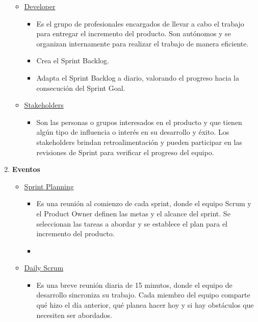 \documentclass[12pt, letterpaper]{article}
\begin{document}
\begin{enumerate}
\begin{itemize}
            \item \underline{Developer}
                \begin{itemize}
                    \item Es el grupo de profesionales encargados de llevar a cabo el trabajo para entregar el 
                    incremento del producto. Son autónomos y se organizan internamente para realizar el trabajo 
                    de manera eficiente.
                    \item Crea el Sprint Backlog.
                    \item Adapta el Sprint Backlog a diario, valorando el progreso hacia la consecución del 
                    Sprint Goal.
                \end{itemize}

            \item \underline{Stakeholders}
                \begin{itemize}
                    \item Son las personas o grupos interesados en el producto y que tienen algún tipo de 
                    influencia o interés en su desarrollo y éxito. Los stakeholders brindan retroalimentación y 
                    pueden participar en las revisiones de Sprint para verificar el progreso del equipo.
                \end{itemize}

        \end{itemize}

    \item \textbf{Eventos}
        \begin{itemize}
            \item \underline{Sprint Planning}
                \begin{itemize}
                    \item Es una reunión al comienzo de cada sprint, donde el equipo Scrum y el Product Owner 
                    definen las metas y el alcance del sprint. Se seleccionan las tareas a abordar y se 
                    establece el plan para el incremento del producto.
                    \item
                \end{itemize}

            \item \underline{Daily Scrum}
                \begin{itemize}
                    \item Es una breve reunión diaria de 15 minutos, donde el equipo de desarrollo sincroniza 
                    su trabajo. Cada miembro del equipo comparte qué hizo el día anterior, qué planea hacer hoy 
                    y si hay obstáculos que necesiten ser abordados.
                \end{itemize}


\end{itemize}
\end{enumerate}
\end{document}
